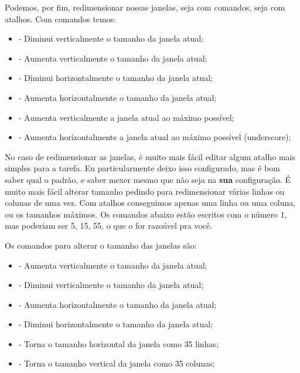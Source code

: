 \documentclass[a4paper, 12pt]{article}
\begin{document}
Podemos, por fim, redimensionar nossas janelas, seja com comandos, seja com atalhos.
Com comandos temos:

\begin{itemize}
    \item {} - Diminui verticalmente o tamanho da janela atual;
    \item {} - Aumenta verticalmente o tamanho da janela atual;
    \item {} - Diminui horizontalmente o tamanho da janela atual;
    \item {} - Aumenta horizontalmente o tamanho da janela atual;
    \item {} - Aumenta verticalmente a janela atual ao máximo possível;
    \item {} - Aumenta horizontalmente a janela atual ao máximo possível (underscore);
\end{itemize}

No caso de redimensionar as janelas, é muito mais fácil editar algum atalho mais simples para a tarefa.
Eu particularmente deixo isso configurado, mas é bom saber qual o padrão, e saber mexer mesmo que não
seja na \textbf{sua} configuração.
É muito mais fácil alterar tamanho pedindo para redimensionar várias linhas ou colunas de uma vez.
Com atalhos conseguimos apenas uma linha ou uma coluna, ou os tamanhos máximos.
Os comandos abaixo estão escritos com o número 1, mas poderiam ser 5, 15, 55, o que o for razoável pra você.

Os comandos para alterar o tamanho das janelas são:
\begin{itemize}
    \item {} - Aumenta verticalmente o tamanho da janela atual;
    \item {} - Diminui verticalmente o tamanho da janela atual;
    \item {} - Aumenta horizontalmente o tamanho da janela atual;
    \item {} - Diminui horizontalmente o tamanho da janela atual;
    \item {} - Torna o tamanho horizontal da janela como 35 linhas;
    \item {} - Torna o tamanho vertical da janela como 35 colunas;
\end{itemize}
\end{document}
